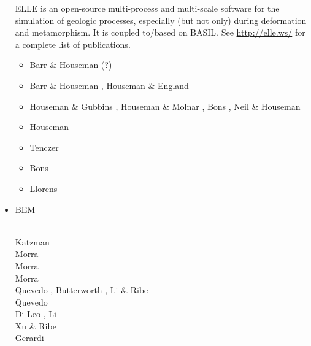 \begin{itemize}
ELLE is an open-source multi-process and multi-scale software for the simulation of geologic processes, especially (but not only) during deformation and metamorphism. It is coupled to/based on BASIL. See \url{http://elle.ws/} for a complete list of publications.

\begin{scriptsize}
\begin{itemize}
\item[\nineteenninetytwo] Barr \& Houseman \cite{baho92}(?)
\item[\nineteenninetysix] Barr \& Houseman \cite{baho96}, Houseman \& England \cite{hoen96}
\item[\nineteenninetyseven] Houseman \& Gubbins \cite{hogu97}, Houseman \& Molnar \cite{homo97},
                            Bons \etal \cite{bobt97}, Neil \& Houseman \cite{neho97}
\item[\twothousand] Houseman \etal \cite{honk00}
\item[\twothousandone] Tenczer \etal \cite{tesb01}
\item[\twothousandeight] Bons \etal \cite{bokj08}
\item[\twothousandnineteen] Llorens \cite{llor19}
\end{itemize}
\end{scriptsize}

\item {\codefont BEM} 

\begin{scriptsize}
\cite{crsr83}\\
Katzman \etal \cite{katl95}\\
Morra \etal \cite{moct07}\\
Morra \etal \cite{moct09}\\
Morra \etal \cite{moyb10}\\
Quevedo \etal \cite{qumm12}, Butterworth \etal \cite{buqm12}, Li \& Ribe \cite{liri12}\\
Quevedo \etal \cite{quhm13}\\
Di Leo \etal \cite{diwl14}, Li \etal \cite{lidr14}\\
Xu \& Ribe \cite{xuri16}\\
Gerardi \etal \cite{gert19}
\end{scriptsize}


\end{itemize}
